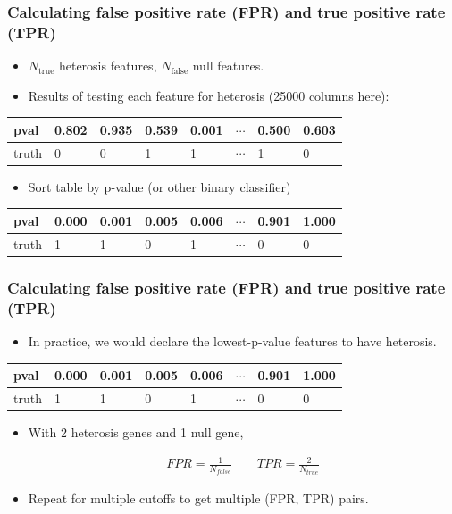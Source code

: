 \documentclass{beamer}
\numberwithin{equation}{section}
\begin{document}
\begin{frame}
\frametitle{Calculating false positive rate (FPR) and true positive rate (TPR)}

\begin{itemize}
\item $N_{\text{true}}$ heterosis features, $N_{\text{false}}$ null features.
\pause \item Results of testing each feature for heterosis (25000 columns here):
\end{itemize}

\begin{tabular}{l|l|l|l|l|l|l|l}
pval & 0.802 & 0.935 & 0.539 & 0.001 & $\cdots$ & 0.500 &  0.603  \\ \hline
truth &  0 & 0 & 1 & 1 & $\cdots$ & 1 & 0 
\end{tabular}

\begin{itemize}

\pause \item Sort table by p-value (or other binary classifier)
\end{itemize}

\begin{tabular}{l|l|l|l|l|l|l|l}
pval & 0.000 & 0.001 & 0.005 & 0.006 & $\cdots$ & 0.901 & 1.000  \\ \hline
truth &  1 & 1 & 0 & 1 & $\cdots$ & 0 & 0
\end{tabular}
\end{frame}

\begin{frame}
\frametitle{Calculating false positive rate (FPR) and true positive rate (TPR)}

\begin{itemize}
\pause \item In practice, we would declare the lowest-p-value features to have heterosis.
\end{itemize}

\pause \begin{tabular}{l|l|l|l|l|l|l|l}
pval & {\color{blue} 0.000} & {\color{blue}0.001} & {\color{blue}0.005} & 0.006 & $\cdots$ & 0.901 & 1.000  \\ \hline
truth & {\color{blue}1} & {\color{blue}1} & {\color{blue}0} & 1 & $\cdots$ & 0 & 0
\end{tabular}

\begin{itemize}
\pause \item With 2 heterosis genes and 1 null gene,

\begin{align*}
FPR = \frac{1}{N_{false}} \qquad TPR = \frac{2}{N_{true}}
\end{align*}

\pause \item Repeat for multiple cutoffs to get multiple (FPR, TPR) pairs.
\end{itemize}
\end{frame}
\end{document}
